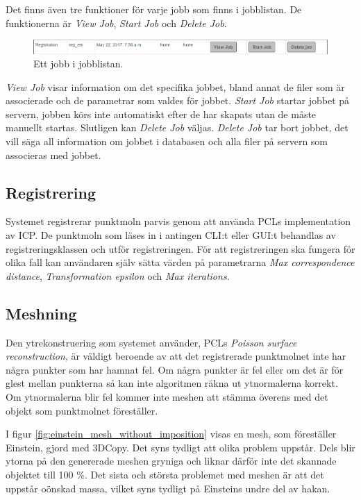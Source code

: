 Det finns även tre funktioner för varje jobb som finns i jobblistan. De funktionerna är \textit{View Job}, \textit{Start Job} och \textit{Delete Job}.

\begin{figure}[H]
	\centering
	\includegraphics[width=130mm]{figures/3DCopyJobInList.PNG}
	\caption{Ett jobb i jobblistan.}
	\label{fig:3DCopyJobInList}
\end{figure}

\textit{View Job} visar information om det specifika jobbet, bland annat de filer som är associerade och de parametrar som valdes för jobbet. \textit{Start Job} startar jobbet på servern, jobben körs inte automatiskt efter de har skapats utan de måste manuellt startas. Slutligen kan \textit{Delete Job} väljas. \textit{Delete Job} tar bort jobbet, det vill säga all information om jobbet i databasen och alla filer på servern som associeras med jobbet.

\subsection{Registrering}
Systemet registrerar punktmoln parvis genom att använda PCLs implementation av ICP. De punktmoln som läses in i antingen CLI:t eller GUI:t behandlas av registreringsklassen och utför registreringen. För att registreringen ska fungera för olika fall kan användaren själv sätta värden på parametrarna \textit{Max correspondence distance}, \textit{Transformation epsilon} och \textit{Max iterations}.

\subsection{Meshning}
Den ytrekonstruering som systemet använder, PCLs \textit{Poisson surface reconstruction}, är väldigt beroende av att det registrerade punktmolnet inte har några punkter som har hamnat fel. Om några punkter är fel eller om det är för glest mellan punkterna så kan inte algoritmen räkna ut ytnormalerna korrekt. Om ytnormalerna blir fel kommer inte meshen att stämma överens med det objekt som punktmolnet föreställer.

I figur \ref{fig:einstein_mesh_without_imposition} visas en mesh, som föreställer Einstein, gjord med 3DCopy. Det syns tydligt att olika problem uppstår. Dels blir ytorna på den genererade meshen gryniga och liknar därför inte det skannade objektet till 100 \%. Det sista och största problemet med meshen är att det uppstår oönskad massa, vilket syns tydligt på Einsteins undre del av hakan.

